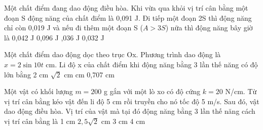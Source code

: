\begin{ex} %
Một chất điểm đang dao động điều hòa. Khi vừa qua khỏi vị trí cân bằng một đoạn S động năng của chất điểm là 0,091 J. Đi tiếp một đoạn 2S thì động năng chỉ còn 0,019 J và nếu đi thêm một đoạn S ($A>3S$) nữa thì động năng bây giờ là
\choice
{0,042 J}
{0,096 J}
{,036 J}
{0,032 J}
\end{ex} 

\begin{ex} %
Một chất điểm dao động dọc theo trục Ox. Phương trình dao động là $x = 2\sin10t$ cm. Li độ x của chất điểm khi động năng bằng 3 lần thế năng có độ lớn bằng
\choice
{2 cm}
{$\sqrt{2}$ cm}
{ cm}
{0,707 cm}

\end{ex} 
\begin{ex}%
Một vật có khối lượng $m = 200$ g gắn với một lò xo có độ cứng $k = 20$ N/cm. Từ vị trí cân bằng kéo vật đến li độ 5 cm rồi truyền cho nó tốc độ 5 m/s. Sau đó, vật dao động điều hòa. Vị trí của vật mà tại đó động năng bằng 3 lần thế năng cách vị trí cân bằng là
\choice
{1 cm}
{\True $2,5\sqrt{2}$ cm}
{3 cm }
{4 cm}
\end{ex} 




